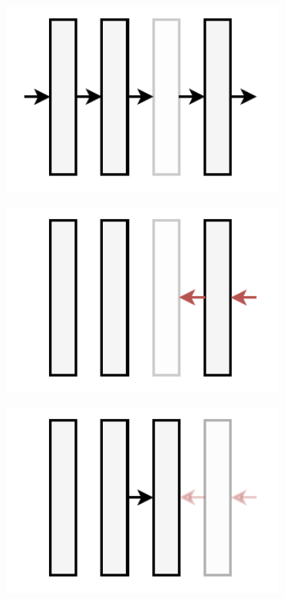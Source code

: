 \begin{figure}
    \centering
    \begin{subfigure}[b]{0.23\textwidth}
    \includegraphics[width=1.0\textwidth]{images/gradient_checkpointing-Pagina-1}
    \caption{}
    \end{subfigure}
    \hfill
    \begin{subfigure}[b]{0.23\textwidth}
    \includegraphics[width=1.0\textwidth]{images/gradient_checkpointing-Pagina-2}
    \caption{}
    \end{subfigure}
    \hfill
    \begin{subfigure}[b]{0.23\textwidth}
    \includegraphics[width=1.0\textwidth]{images/gradient_checkpointing-Pagina-3}

\end{subfigure}
\end{figure}
